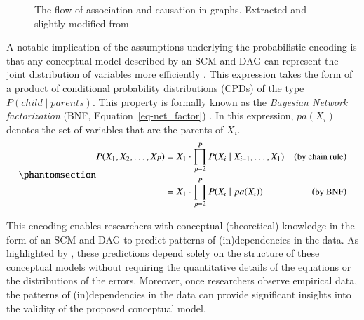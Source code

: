 \documentclass[
  authoryear,
  review,
  1p]{elsarticle}
\begin{document}
\begin{figure}


\caption{\label{fig-ACflow}The flow of association and causation in
graphs. Extracted and slightly modified from \citet[pp.~31]{Neal_2020}}

\end{figure}%

A notable implication of the assumptions underlying the probabilistic
encoding is that any conceptual model described by an SCM and DAG can
represent the joint distribution of variables more efficiently
\citep[pp.~29]{Pearl_et_al_2016}. This expression takes the form of a
product of conditional probability distributions (CPDs) of the type
\(P(child \mid parents)\). This property is formally known as the
\emph{Bayesian Network factorization} (BNF,
Equation~\ref{eq-net_factor})
\citetext{\citealp[pp.~29]{Pearl_et_al_2016}; \citealp[pp.~21]{Neal_2020}}.
In this expression, \(pa(X_{i})\) denotes the set of variables that are
the parents of \(X_{i}\).
\begin{equation}\phantomsection\label{eq-net_factor}{
\begin{aligned}
P(X_{1}, X_{2}, \dots, X_{P}) & = X_{1} \cdot \prod^{P}_{p=2} P(X_{i} \mid X_{i-1}, \dots, X_{1}) & (\small{\text{by chain rule})}\\
& = X_{1} \cdot \prod^{P}_{p=2} P(X_{i} \mid pa(X_{i}) ) & (\small{\text{by BNF}})
\end{aligned}
}\end{equation}

This encoding enables researchers with conceptual (theoretical)
knowledge in the form of an SCM and DAG to predict patterns of
(in)dependencies in the data. As highlighted by
\citet[pp.~35]{Pearl_et_al_2016}, these predictions depend solely on the
structure of these conceptual models without requiring the quantitative
details of the equations or the distributions of the errors. Moreover,
once researchers observe empirical data, the patterns of
(in)dependencies in the data can provide significant insights into the
validity of the proposed conceptual model.
\end{document}

